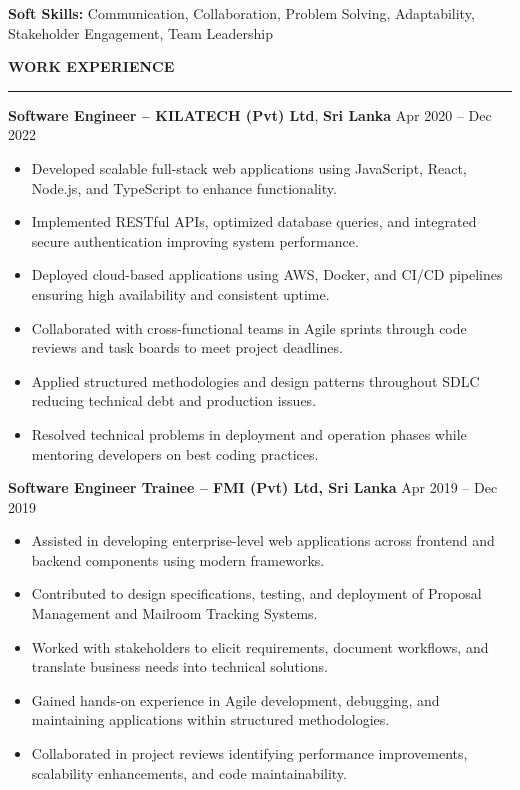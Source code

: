 \documentclass[10pt,letterpaper]{article}
\begin{document}
\textbf{Soft Skills:} Communication, Collaboration, Problem Solving, Adaptability, Stakeholder Engagement, Team Leadership

\vspace{8pt}

\textbf{WORK EXPERIENCE}\\[-8pt]
\noindent\rule{\textwidth}{1pt}

\vspace{-2pt}

\textbf{Software Engineer -- KILATECH (Pvt) Ltd}, \textbf{Sri Lanka} \hfill Apr 2020 -- Dec 2022

\vspace{-1pt}

\begin{itemize}
\item Developed scalable full-stack web applications using JavaScript, React, Node.js, and TypeScript to enhance functionality.
\item Implemented RESTful APIs, optimized database queries, and integrated secure authentication improving system performance.
\item Deployed cloud-based applications using AWS, Docker, and CI/CD pipelines ensuring high availability and consistent uptime.
\item Collaborated with cross-functional teams in Agile sprints through code reviews and task boards to meet project deadlines.
\item Applied structured methodologies and design patterns throughout SDLC reducing technical debt and production issues.
\item Resolved technical problems in deployment and operation phases while mentoring developers on best coding practices.
\end{itemize}

\textbf{Software Engineer Trainee -- FMI (Pvt) Ltd, Sri Lanka} \hfill Apr 2019 -- Dec 2019

\vspace{-1pt}

\begin{itemize}
\item Assisted in developing enterprise-level web applications across frontend and backend components using modern frameworks.
\item Contributed to design specifications, testing, and deployment of Proposal Management and Mailroom Tracking Systems.
\item Worked with stakeholders to elicit requirements, document workflows, and translate business needs into technical solutions.
\item Gained hands-on experience in Agile development, debugging, and maintaining applications within structured methodologies.
\item Collaborated in project reviews identifying performance improvements, scalability enhancements, and code maintainability.
\end{itemize}
\end{document}
